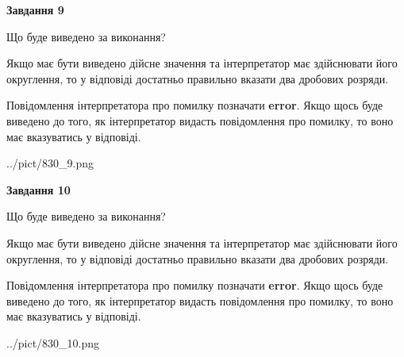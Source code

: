 \documentclass[12pt, ukrainian]{article}
\begin{document}
{\begin {Large}
{\begin {center}\textbf{Завдання 9}\end {center}}\par
Що буде виведено за виконання? \par

Якщо має бути виведено дійсне значення та інтерпретатор має здійснювати його округлення, 
то у відповіді достатньо правильно вказати два дробових розряди.

Повідомлення інтерпретатора про помилку позначати \textbf{error}.
Якщо щось буде виведено до того, як інтерпретатор видасть повідомлення про помилку, 
то воно має вказуватись у відповіді. \par

\begin{center}
	{../pict/830_9.png}
\end{center}
\newpage

{\begin {center}\textbf{Завдання 10}\end {center}}\par
Що буде виведено за виконання? \par

Якщо має бути виведено дійсне значення та інтерпретатор має здійснювати його округлення, 
то у відповіді достатньо правильно вказати два дробових розряди.

Повідомлення інтерпретатора про помилку позначати \textbf{error}.
Якщо щось буде виведено до того, як інтерпретатор видасть повідомлення про помилку, 
то воно має вказуватись у відповіді. \par

\begin{center}
	{../pict/830_10.png}
\end{center}
\newpage

\end {Large}}
\end{document}
